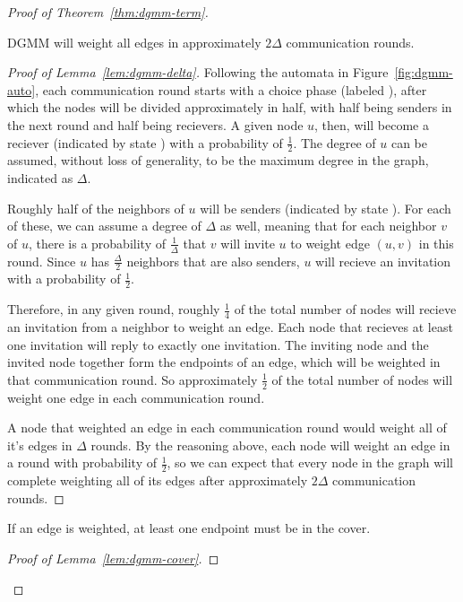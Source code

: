 \begin{proof}[Proof of Theorem~\ref{thm:dgmm-term}]
\begin{lem}
  \label{lem:dgmm-delta}
  DGMM will weight all edges in approximately $2\Delta$ communication rounds.
\end{lem}
\begin{proof}[Proof of Lemma~\ref{lem:dgmm-delta}]

Following the automata in Figure~\ref{fig:dgmm-auto}, each communication round starts with a choice phase (labeled \cCd), after which the nodes will be divided approximately in half, with half being senders in the next round and half being recievers. A given node $u$, then, will become a reciever (indicated by state \cLd) with a probability of $\frac{1}{2}$. The degree of $u$ can be assumed, without loss of generality, to be the maximum degree in the graph, indicated as $\Delta$. 

Roughly half of the neighbors of $u$ will be senders (indicated by state \cId). For each of these, we can assume a degree of $\Delta$ as well, meaning that for each neighbor $v$ of $u$, there is a probability of $\frac{1}{\Delta}$ that $v$ will invite $u$ to weight edge $(u,v)$ in this round. Since $u$ has $\frac{\Delta}{2}$ neighbors that are also senders, $u$ will recieve an invitation with a probability of $\frac{1}{2}$. 

Therefore, in any given round, roughly $\frac{1}{4}$ of the total number of nodes will recieve an invitation from a neighbor to weight an edge. Each node that recieves at least one invitation will reply to exactly one invitation. The inviting node and the invited node together form the endpoints of an edge, which will be weighted in that communication round. So approximately $\frac{1}{2}$ of the total number of nodes will weight one edge in each communication round.

A node that weighted an edge in each communication round would weight all of it's edges in $\Delta$ rounds. By the reasoning above, each node will weight an edge in a round with probability of $\frac{1}{2}$, so we can expect that every node in the graph will complete weighting all of its edges after approximately $2\Delta$ communication rounds.

\end{proof}
\begin{lem}
  \label{lem:dgmm-cover}
  If an edge is weighted, at least one endpoint must be in the cover.
\end{lem}
\begin{proof}[Proof of Lemma~\ref{lem:dgmm-cover}]


\end{proof}
\end{proof}
